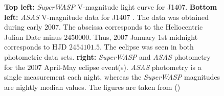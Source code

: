 \begin{figure}[!ht]
\centering
\caption{\scriptsize{ \textbf{Top left:} \textit{SuperWASP} V-magnitude light curve for J1407. \textbf{Bottom left:} \textit{ASAS} V-magnitude data for J1407 . The data was obtained during early $2007$. The abscissa corresponds to the Heliocentric Julian Date minus $2450000$. Thus, $2007$ January $1$st midnight corresponds to HJD $2454101.5$. The eclipse was seen in both photometric data sets. \textbf{right:} \textit{SuperWASP} and \textit{ASAS} photometry for the $2007$ April-May eclipse event(s). \textit{ASAS} photometry is a single measurement each night, whereas the \textit{SuperWASP} magnitudes are nightly median values. The figures are taken from (\citeyear{2012AJ....143...72M})}}
\label{fig:Mamajek_J1407_1}
\end{figure}

